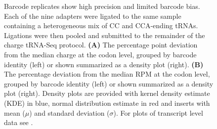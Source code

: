 \documentclass[9pt,lineno]{elife}
\begin{document}
\begin{figure}[ht!]
\centering
{}
\caption{
Barcode replicates show high precision and limited barcode bias.
Each of the nine adapters were ligated to the same sample containing a heterogeneous mix of CC and CCA-ending tRNAs.
Ligations were then pooled and submitted to the remainder of the charge tRNA-Seq protocol.
\textbf{(A)} The percentage point deviation from the median charge at the codon level, grouped by barcode identity (left) or shown summarized as a density plot (right).
\textbf{(B)} The percentage deviation from the median RPM at the codon level, grouped by barcode identity (left) or shown summarized as a density plot (right).
Density plots are provided with kernel density estimate (KDE) in blue, normal distribution estimate in red and inserts with mean ($\mu$) and standard deviation ($\sigma$).
For plots of transcript level data see .
}
\label{fig:Fig4}

\label{figsupp:f4S1}


\end{figure}
\end{document}
